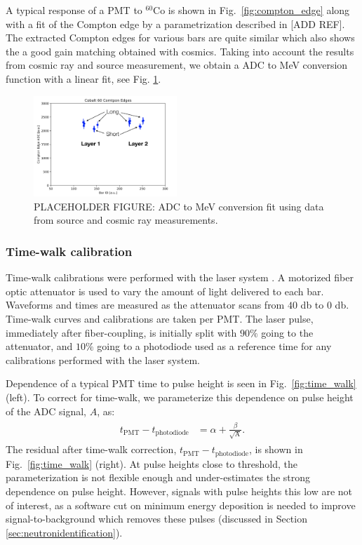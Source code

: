 \documentclass[3p,final,twocolumn]{elsarticle}
\begin{document}
A typical response of a PMT to  $^{60}$Co is shown in Fig.~\ref{fig:compton_edge} along with a fit of the Compton edge by a parametrization described in [ADD REF]. The extracted Compton edges for various bars are quite similar which also shows the a good gain matching obtained with cosmics. Taking into account the results from cosmic ray and  source measurement, we obtain a ADC to MeV conversion function with a linear fit, see Fig. \ref{fig:mev_conversion}.


\begin{figure}[tbh]
	\centering
			\includegraphics[width=0.48\textwidth]{coedges.png}
	\caption{PLACEHOLDER FIGURE: ADC to MeV conversion fit using data from source and cosmic ray measurements.}
	\label{fig:mev_conversion}
\end{figure}

\subsubsection{Time-walk calibration}
Time-walk calibrations were performed with the laser system \cite{band-laser}. A motorized fiber optic attenuator is used to vary
the amount of light delivered to each bar. Waveforms and times are measured as the attenuator scans from $40$ \si{\decibel} to $0$ 
\si{\decibel}. Time-walk curves and calibrations are taken per PMT. The laser pulse, immediately after fiber-coupling, is initially 
split with $90\%$ going to the attenuator, and $10\%$ going to a photodiode used as a reference time for any calibrations 
performed with the laser system.

Dependence of a typical PMT time to pulse height is seen in Fig.~\ref{fig:time_walk} (left). To correct for time-walk, we parameterize 
this dependence on pulse height of the ADC signal, $A$, as:
\begin{eqnarray}
	\begin{split}
		t_{\mathrm{PMT}}-t_{\mathrm{photodiode}}	&= \alpha + \frac{\beta}{\sqrt{\textrm{A}}}.				
		\label{eqn:time_walk}
	\end{split}
\end{eqnarray}
The residual after time-walk correction, $t_{\mathrm{PMT}}-t_{\mathrm{photodiode}}$, is shown in Fig.~\ref{fig:time_walk} (right). At pulse heights close to threshold, the 
parameterization is not flexible enough and under-estimates the strong dependence on pulse height. However, signals with pulse 
heights this low are not of interest, as a software cut on minimum energy deposition is needed to improve signal-to-background 
which removes these pulses (discussed in Section \ref{sec:neutronidentification}).
\end{document}
